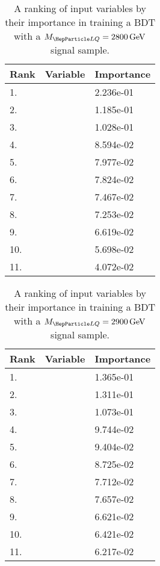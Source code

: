 \begin{table}[H]
	\caption{A ranking of input variables by their importance in training a BDT with a $\MLQ = \SI{2800}{GeV}$ signal sample.}
	\begin{center}
		\begin{tabular}{lll} \hline \hline
			Rank & Variable & Importance  \\ \hline
			1. & \DRof{\PmuOne+\PmuTwo}{\PjOne} & 2.236e-01 \\
			2. & \MujTwo & 1.185e-01 \\
			3. & \Muujj & 1.028e-01 \\
			4. & \ptof{\PjTwo} & 8.594e-02 \\
			5. & \MujOne & 7.977e-02 \\
			6. & \ST & 7.824e-02 \\
			7. & \Muu & 7.467e-02 \\
			8. & \ptof{\PjOne} & 7.253e-02 \\
			9. & \ptof{\PmuTwo} & 6.619e-02 \\
			10. & \ptof{\PmuOne} & 5.698e-02 \\
			11. & \MET & 4.072e-02 \\ \hline \hline
		\end{tabular}
		\label{tab:bdtRank2800}
	\end{center}
\end{table}

\begin{table}[H]
	\caption{A ranking of input variables by their importance in training a BDT with a $\MLQ = \SI{2900}{GeV}$ signal sample.}
	\begin{center}
		\begin{tabular}{lll} \hline \hline
			Rank & Variable & Importance  \\ \hline
			1. & \MujTwo & 1.365e-01 \\
			2. & \DRof{\PmuOne+\PmuTwo}{\PjOne} & 1.311e-01 \\
			3. & \Muujj & 1.073e-01 \\
			4. & \ptof{\PjTwo} & 9.744e-02 \\
			5. & \MujOne & 9.404e-02 \\
			6. & \ptof{\PjOne} & 8.725e-02 \\
			7. & \ST & 7.712e-02 \\
			8. & \Muu & 7.657e-02 \\
			9. & \ptof{\PmuTwo} & 6.621e-02 \\
			10. & \ptof{\PmuOne} & 6.421e-02 \\
			11. & \MET & 6.217e-02 \\ \hline \hline
		\end{tabular}
		\label{tab:bdtRank2900}
	\end{center}
\end{table}


